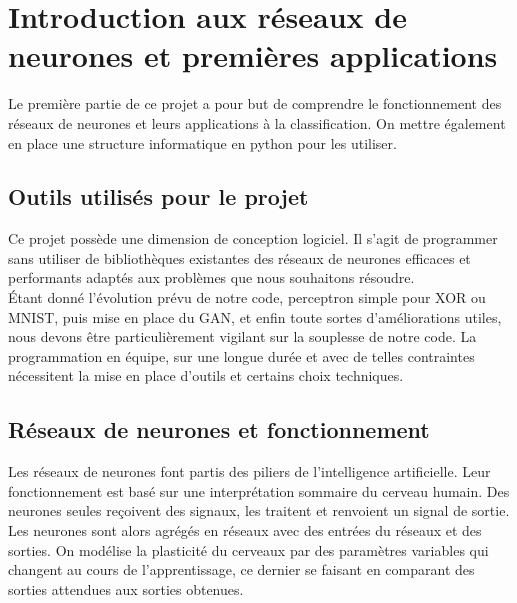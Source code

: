 

\chapter{Introduction aux réseaux de neurones et premières applications}

Le première partie de ce projet a pour but de comprendre le fonctionnement des réseaux de neurones et leurs applications à la classification. On mettre également en place une structure informatique en python pour les utiliser.

\section{Outils utilisés pour le projet}

Ce projet possède une dimension de conception logiciel. Il s'agit de programmer sans utiliser de bibliothèques existantes des réseaux de neurones efficaces et performants adaptés aux problèmes que nous souhaitons résoudre.\\
Étant donné l'évolution prévu de notre code, perceptron simple pour XOR ou  MNIST, puis mise en place du GAN, et enfin toute sortes d'améliorations utiles, nous devons être particulièrement vigilant sur la souplesse de notre code. La programmation en équipe, sur une longue durée et avec de telles contraintes nécessitent la mise en place d'outils et certains choix techniques.

\section{Réseaux de neurones et fonctionnement}


Les réseaux de neurones font partis des piliers de l'intelligence artificielle. Leur fonctionnement est basé sur une interprétation sommaire du cerveau humain. Des neurones seules reçoivent des signaux, les traitent et renvoient un signal de sortie. Les neurones sont alors agrégés en réseaux avec des entrées du réseaux et des sorties. On modélise la plasticité du cerveaux par des paramètres variables qui changent au cours de l'apprentissage, ce dernier se faisant en comparant des sorties attendues aux sorties obtenues.

